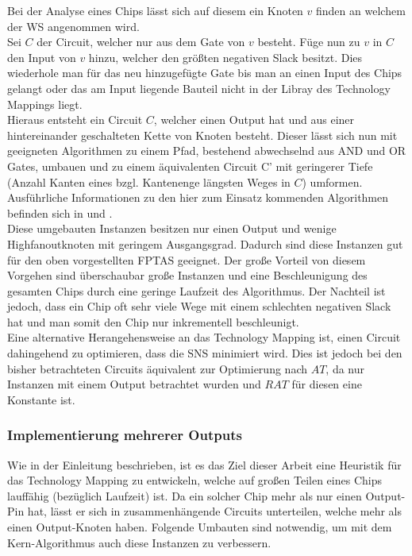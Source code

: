 \documentclass[11pt, a4paper, german]{article}
\newcommand{\TM}{Technology  Mapping }
\begin{document}
Bei der Analyse eines Chips lässt sich auf diesem ein Knoten $v$ finden an welchem der WS angenommen wird.\\
Sei $C$ der Circuit, welcher nur aus dem Gate von $v$ besteht. Füge nun zu $v$ in $C$ den Input von $v$ hinzu, welcher den größten negativen Slack besitzt. Dies wiederhole man für das neu hinzugefügte Gate bis man an einen Input des Chips gelangt oder das am Input liegende Bauteil nicht in der Libray des Technology Mappings liegt. \\
Hieraus entsteht ein Circuit $C$, welcher einen Output hat und aus einer hintereinander geschalteten Kette von Knoten besteht. Dieser lässt sich nun mit geeigneten Algorithmen zu einem Pfad, bestehend abwechselnd aus AND und OR Gates,  umbauen und  zu einem äquivalenten Circuit C' mit geringerer Tiefe (Anzahl Kanten eines bzgl. Kantenenge längsten  Weges in $C$) umformen. Ausführliche Informationen zu den hier zum Einsatz kommenden Algorithmen befinden sich in \cite{Werber} und \cite{Hermann}.\\

Diese umgebauten Instanzen besitzen nur einen Output und wenige Highfanoutknoten mit geringem Ausgangsgrad. Dadurch sind diese Instanzen gut für den oben vorgestellten FPTAS geeignet. Der große Vorteil von diesem Vorgehen sind überschaubar große Instanzen und eine Beschleunigung des gesamten Chips durch eine geringe Laufzeit des Algorithmus. Der Nachteil ist jedoch, dass ein Chip oft sehr viele Wege mit einem schlechten negativen Slack hat und man somit den Chip nur inkrementell beschleunigt.\\

Eine alternative Herangehensweise an das \TM ist, einen Circuit dahingehend zu optimieren, dass die SNS minimiert wird. Dies ist jedoch bei den bisher betrachteten Circuits äquivalent zur Optimierung nach $AT$, da nur Instanzen mit einem Output betrachtet wurden und $RAT$ für diesen eine Konstante ist.

\subsubsection{Implementierung mehrerer Outputs}
\label{subsec:mehrere_outputs}
Wie in der Einleitung beschrieben, ist es das Ziel dieser Arbeit eine Heuristik für das \TM zu entwickeln, welche auf großen Teilen eines Chips lauffähig (bezüglich Laufzeit) ist. Da ein solcher Chip mehr als nur einen Output-Pin hat, lässt er sich in zusammenhängende Circuits unterteilen, welche mehr als einen Output-Knoten haben. Folgende Umbauten sind notwendig, um mit dem Kern-Algorithmus auch diese Instanzen zu verbessern.\\
\end{document}
